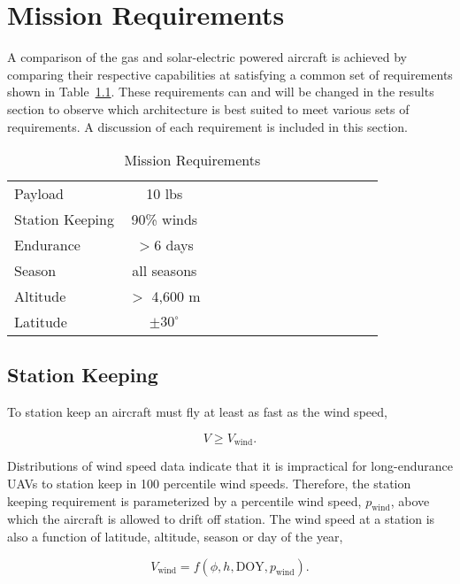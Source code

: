 
\chapter{Mission Requirements}

A comparison of the gas and solar-electric powered aircraft is achieved by comparing their respective capabilities at satisfying a common set of requirements shown in Table~\ref{t:mreqs}.  These requirements can and will be changed in the results section to observe which architecture is best suited to meet various sets of requirements. A discussion of each requirement is included in this section.  

\begin{longtable}{lccccccccccccc}
\caption{Mission Requirements}\\
\toprule
\toprule
\label{t:mreqs}
Payload & 10 lbs\\
Station Keeping & 90\% winds \\
Endurance & $>6$ days\\
Season & all seasons\\
Altitude & $>$ 4,600 m\\
Latitude & $\pm30^{\circ}$\\
\bottomrule
\end{longtable}

\section{Station Keeping}

To station keep an aircraft must fly at least as fast as the wind speed,

\begin{equation}
    \label{e:availreq}
    V \geq V_{\text{wind}}.
\end{equation}

Distributions of wind speed data\cite{wind} indicate that it is impractical for long-endurance UAVs to station keep in 100 percentile wind speeds.  
Therefore, the station keeping requirement is parameterized by a percentile wind speed, $p_{\text{wind}}$, above which the aircraft is allowed to drift off station. 
The wind speed at a station is also a function of latitude, altitude, season or day of the year,

\begin{equation}
    \label{e:windspeed}
    V_{\text{wind}} = f(\phi, h, \text{DOY}, p_{\text{wind}}).
    \end{equation}

